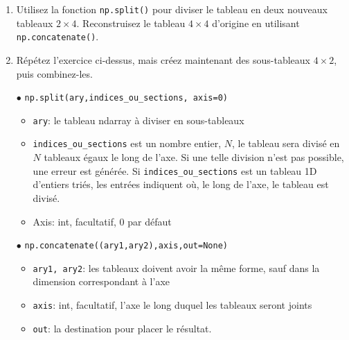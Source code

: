 \documentclass[a4paper]{article}
\begin{document}
\begin{enumerate}
\item Utilisez la fonction {\tt np.split()} pour diviser le tableau en deux nouveaux tableaux $2\times 4$.
Reconstruisez le tableau $4\times 4$ d'origine en utilisant {\tt np.concatenate()}.
\item Répétez l'exercice ci-dessus, mais créez maintenant des sous-tableaux $4\times 2$, puis combinez-les.
\end{enumerate}
\begin{itemize}
\item[$\bullet$] {\tt np.split(ary,indices\_ou\_sections, axis=0)}
\begin{itemize}
\item {\tt ary}: le tableau ndarray à diviser en sous-tableaux
\item {\tt indices\_ou\_sections} est un nombre entier, $N$, le tableau sera divisé en $N$ tableaux égaux le long de l’axe. Si une telle division n'est pas possible, une erreur est générée.
 Si {\tt  indices\_ou\_sections} est un tableau 1D d'entiers triés, les entrées indiquent où, le long de l'axe, le tableau est divisé.
\item Axis: int, facultatif, 0 par défaut
\end{itemize}
\item[$\bullet$] {\tt np.concatenate((ary1,ary2),axis,out=None)}
\begin{itemize}
\item {\tt ary1, ary2}: les tableaux doivent avoir la même forme, sauf dans la dimension correspondant à l'axe
\item {\tt axis}: int, facultatif, l'axe le long duquel les tableaux seront joints
\item {\tt out}: la destination pour placer le résultat.
\end{itemize}
\end{itemize}
\end{document}

